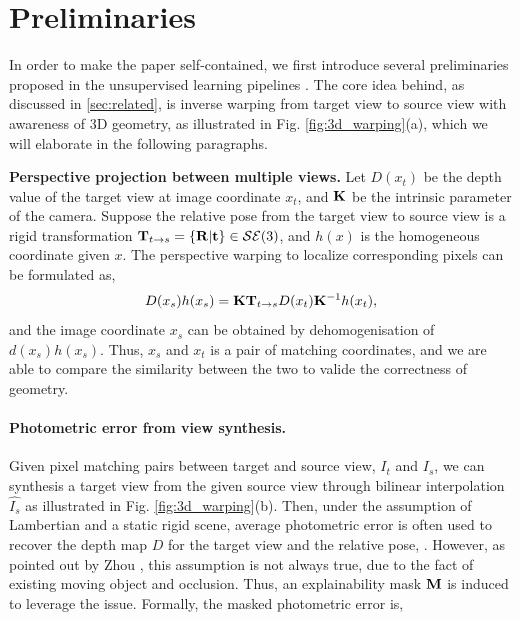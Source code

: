 \section{Preliminaries}
\label{sec:preliminaries}
In order to make the paper self-contained, we first introduce several preliminaries proposed in the unsupervised learning pipelines \cite{zhou2017unsupervised,}. The core idea behind, as discussed in \ref{sec:related}, is inverse warping from target view to source view with awareness of 3D geometry, as illustrated in Fig. \ref{fig:3d_warping}(a), which we will elaborate in the following paragraphs.

\textbf{Perspective projection between multiple views.}
Let $D(x_t)$ be the depth value of the target view at image coordinate $x_t$, and ${\mathbf K}$ be the intrinsic parameter of the camera. Suppose the relative pose from the target view to source view is a rigid transformation ${\mathbf T}_{t\rightarrow s} = \{{\mathbf R} | {\mathbf t}\} \in {\mathcal S}{\mathcal E}(3)$, and $h(x)$ is the homogeneous coordinate given $x$. The perspective warping to localize corresponding pixels can be formulated as, 
\begin{align}
\label{eqn:warp}
D(x_s)h(x_s) = {\mathbf K}{\mathbf T}_{t\rightarrow s}D(x_t){\mathbf K}^{-1}h(x_t),
\end{align}
and the image coordinate $x_s$ can be obtained by dehomogenisation of $d(x_s)h(x_s)$. Thus, $x_s$ and $x_t$ is a pair of matching coordinates, and we are able to compare the similarity between the two to valide the correctness of geometry.


\paragraph{Photometric error from view synthesis.} 
\label{chap:warping}
Given pixel matching pairs between target and source view, \ie $I_t$ and $I_s$, we can synthesis a target view from the given source view through bilinear interpolation~\cite{} $\hat{I_s}$ as illustrated in Fig. \ref{fig:3d_warping}(b). 
Then, under the assumption of Lambertian and a static rigid scene, average photometric error is often used to recover the depth map $D$ for the target view and the relative pose, \eg \cite{DBLP:conf/iccv/NewcombeLD11, zhou2017unsupervised}. 
However, as pointed out by Zhou \etal \cite{zhou2017unsupervised}, this assumption is not always true, due to the fact of existing moving object and occlusion. Thus, an explainability mask ${\mathbf M}$ is induced to leverage the issue. Formally, the masked photometric error is,

